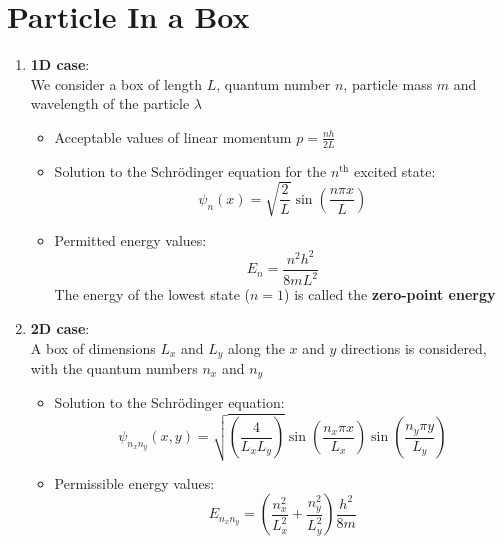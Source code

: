 \documentclass[a4paper]{article}
\begin{document}
\section{Particle In a Box}
\begin{enumerate}

    \item \textbf{1D case}:\\
    We consider a box of length $L$, quantum number $n$, particle mass $m$ and wavelength of the particle $\lambda$
    \begin{itemize}
        \item Acceptable values of linear momentum $p = \frac{nh}{2L}$
        \item Solution to the Schrödinger equation for the $n^{\text{th}}$ excited state:
        \begin{equation*}
            \psi_n(x) = \sqrt{\frac{2}{L}}\sin{\left(\frac{n\pi x}{L}\right)}
        \end{equation*}
        \item Permitted energy values:
        \begin{equation*}
            E_n = \frac{n^2h^2}{8mL^2}
        \end{equation*}
        The energy of the lowest state ($n=1$) is called the \textbf{zero-point energy}
    \end{itemize}
    
    \item \textbf{2D case}:\\
    A box of dimensions $L_x$ and $L_y$ along the $x$ and $y$ directions is considered, with the quantum numbers $n_x$ and $n_y$
    \begin{itemize}
        \item Solution to the Schrödinger equation:
        \begin{equation*}
            \psi_{n_xn_y}(x,y) = \sqrt{\left(\frac{4}{L_xL_y}\right)}\sin{\left(\frac{n_x\pi x}{L_x}\right)}\sin{\left(\frac{n_y\pi y}{L_y}\right)}
        \end{equation*}
        \item Permissible energy values:
        \begin{equation*}
            E_{n_xn_y} = \left(\frac{n_x^2}{L_x^2} + \frac{n_y^2}{L_y^2}\right)\frac{h^2}{8m}
        \end{equation*}
    \end{itemize}
\end{enumerate}
\end{document}
